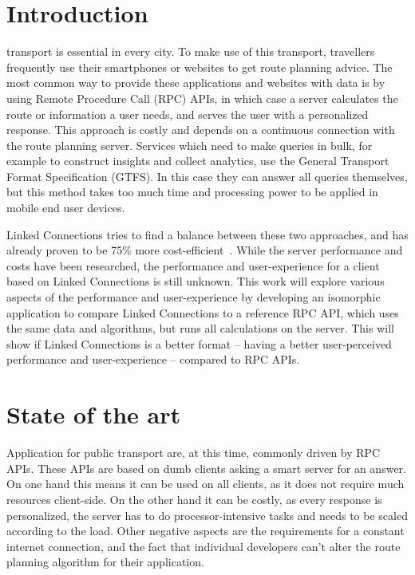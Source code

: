 \documentclass[twocolumn]{phdsymp} %
\begin{document}
\section{Introduction}
 transport is essential in every city. To make use of this transport, travellers frequently use their smartphones or websites to get route planning advice. The most common way to provide these applications and websites with data is by using Remote Procedure Call (RPC) APIs, in which case a server calculates the route or information a user needs, and serves the user with a personalized response. This approach is costly and depends on a continuous connection with the route planning server. Services which need to make queries in bulk, for example to construct insights and collect analytics, use the General Transport Format Specification (GTFS). In this case they can answer all queries themselves, but this method takes too much time and processing power to be applied in mobile end user devices.

Linked Connections tries to find a balance between these two approaches, and has already proven to be 75\% more cost-efficient~\cite{colpaert17}. While the server performance and costs have been researched, the performance and user-experience for a client based on Linked Connections is still unknown. This work will explore various aspects of the performance and user-experience by developing an isomorphic application to compare Linked Connections to a reference RPC API, which uses the same data and algorithms, but runs all calculations on the server. This will show if Linked Connections is a better format -- having a better user-perceived performance and user-experience -- compared to RPC APIs.

\section{State of the art}

Application for public transport are, at this time, commonly driven by RPC APIs. These APIs are based on dumb clients asking a smart server for an answer. On one hand this means it can be used on all clients, as it does not require much resources client-side. On the other hand it can be costly, as every response is personalized, the server has to do processor-intensive tasks and needs to be scaled according to the load. Other negative aspects are the requirements for a constant internet connection, and the fact that individual developers can't alter the route planning algorithm for their application.
\end{document}
